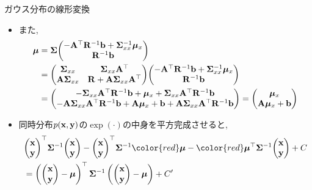 \documentclass[dvipdfmx,notheorems,t]{beamer}
\begin{document}
\begin{frame}{ガウス分布の線形変換}
\begin{itemize}
  \item また,
  {\small \begin{align*}
    \vb*{\mu} &= \vb{\Sigma}
      \mqty(-\vb{A}^\top \vb{R}^{-1} \vb{b} + \vb{\Sigma}_{xx}^{-1} \vb*{\mu}_x \\ \vb{R}^{-1} \vb{b}) \\
    &= \mqty(\vb{\Sigma}_{xx} & \vb{\Sigma}_{xx} \vb{A}^\top \\
      \vb{A} \vb{\Sigma}_{xx} & \vb{R} + \vb{A} \vb{\Sigma}_{xx} \vb{A}^\top)
      \mqty(-\vb{A}^\top \vb{R}^{-1} \vb{b} + \vb{\Sigma}_{xx}^{-1} \vb*{\mu}_x \\ \vb{R}^{-1} \vb{b}) \\
    &= \mqty(-\vb{\Sigma}_{xx} \vb{A}^\top \vb{R}^{-1} \vb{b} + \vb*{\mu}_x
      + \vb{\Sigma}_{xx} \vb{A}^\top \vb{R}^{-1} \vb{b} \\
      -\vb{A} \vb{\Sigma}_{xx} \vb{A}^\top \vb{R}^{-1} \vb{b}
      + \vb{A} \vb*{\mu}_x + \vb{b} + \vb{A} \vb{\Sigma}_{xx} \vb{A}^\top \vb{R}^{-1} \vb{b})
    = \mqty(\vb*{\mu}_x \\ \vb{A} \vb*{\mu}_x + \vb{b})
  \end{align*}}
  \item 同時分布$p(\vb{x}, \vb{y})$の$\exp(\cdot)$の中身を平方完成させると,
  {\small \begin{align*}
    & \mqty(\vb{x} \\ \vb{y})^\top \vb{\Sigma}^{-1} \mqty(\vb{x} \\ \vb{y})
      - \mqty(\vb{x} \\ \vb{y})^\top \vb{\Sigma}^{-1} {\color{red} \vb*{\mu}}
      - {\color{red} \vb*{\mu}^\top}
      \vb{\Sigma}^{-1} \mqty(\vb{x} \\ \vb{y}) + C \\
    &= \left( \mqty(\vb{x} \\ \vb{y}) - \vb*{\mu} \right)^\top \vb{\Sigma}^{-1}
      \left( \mqty(\vb{x} \\ \vb{y}) - \vb*{\mu} \right) + C'
  \end{align*}}
\end{itemize}
\end{frame}
\end{document}

